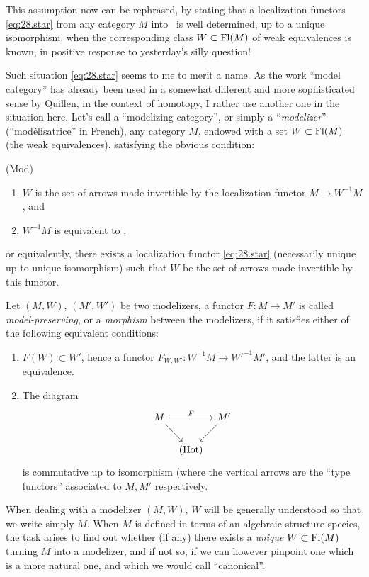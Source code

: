 This assumption now can be rephrased, by stating that a localization
functors \eqref{eq:28.star} from any category $M$ into \Hot\ is well
determined, up to a unique isomorphism, when the corresponding class
$W \subset \operatorname{Fl}(M)$ of weak equivalences is known, in positive response
to yesterday's silly question!

Such situation \eqref{eq:28.star} seems to me to merit a name. As the
work ``model category'' has already been used in a somewhat different
and more sophisticated sense by Quillen, in the context of homotopy, I
rather use another one in the situation here. Let's call
a ``modelizing category'', or simply a ``\emph{modelizer}''
(``mod\'elisatrice'' in French), any category $M$, endowed with a set
$W \subset \operatorname{Fl}(M)$ (the weak equivalences), satisfying the obvious
condition:

\noindent\parbox[t]{0.1\textwidth}{(Mod)\par}
\parbox[t]{0.9\textwidth}{\vspace*{-11pt}%
  \begin{enumerate}[,label=\alph*)]
  \item\label{it:Mod.a}
    $W$ is the set of arrows made invertible by the localization
    functor $M \to W^{-1}M$, and
  \item\label{it:Mod.b}
    $W^{-1}M$ is equivalent to \Hot,
  \end{enumerate}}
or equivalently, there exists a localization functor
\eqref{eq:28.star} (necessarily unique up to unique isomorphism) such
that $W$ be the set of arrows made invertible by this functor.

Let $(M,W)$, $(M',W')$ be two modelizers, a functor $F: M\to M'$ is
called \emph{model-preserving}, or a \emph{morphism} between the
modelizers, if it satisfies either of the following equivalent
conditions:
\begin{enumerate}[label=(\roman*)]
\item $F(W) \subset W'$, hence a functor $F_{W,W'}: W^{-1}M \to
  W'^{-1}M'$, and the latter is an equivalence.
\item The diagram
\[  \begin{tikzcd}[column sep=tiny]
    M \ar[dr] \ar[rr, "F"] & & M'\ar[dl] \\ & \Hot &
  \end{tikzcd}\]
  is commutative up to isomorphism (where the vertical arrows are the
  ``type functors'' associated to $M,M'$ respectively.
\end{enumerate}
When dealing with a modelizer $(M,W)$, $W$ will be generally
understood so that we write simply $M$. When $M$ is defined in terms
of an algebraic structure species, the task arises to find out whether
(if any) there exists a \emph{unique} $W \subset \operatorname{Fl}(M)$ turning $M$
into a modelizer, and if not so, if we can however pinpoint one which
is a more natural one, and which we would call ``canonical''.

